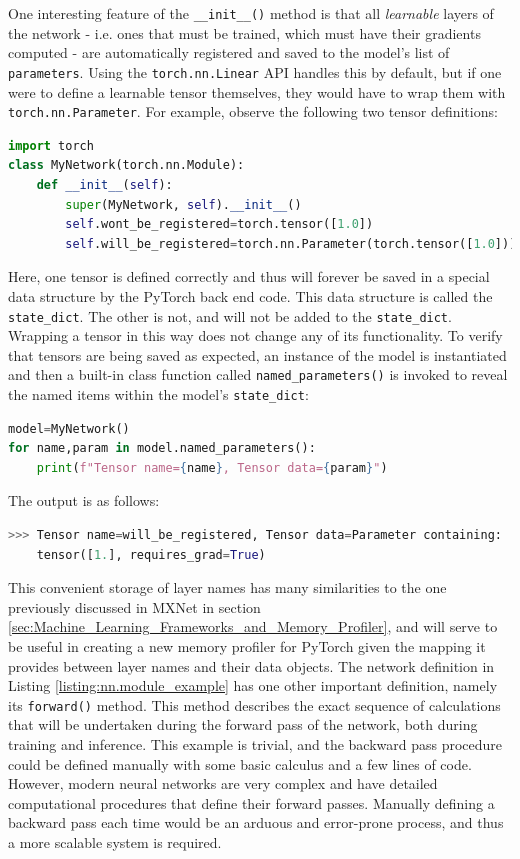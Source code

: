 \documentclass[12pt,letterpaper]{article}
\begin{document}
One interesting feature of the \texttt{\_\_init\_\_()} method is that all \textit{learnable} layers of the network - i.e. ones that must be trained, which must have their gradients computed - are automatically registered and saved to the model's list of \texttt{parameters}. Using the \texttt{torch.nn.Linear} API handles this by default, but if one were to define a learnable tensor themselves, they would have to wrap them with \texttt{torch.nn.Parameter}. For example, observe the following two tensor definitions: 

\begin{lstlisting}[language=Python]
import torch
class MyNetwork(torch.nn.Module):
    def __init__(self):
        super(MyNetwork, self).__init__()
        self.wont_be_registered=torch.tensor([1.0])
        self.will_be_registered=torch.nn.Parameter(torch.tensor([1.0]))
\end{lstlisting}
Here, one tensor is defined correctly and thus will forever be saved in a special data structure by the PyTorch back end code. This data structure is called the \texttt{state\_dict}. The other is not, and will not be added to the \texttt{state\_dict}. Wrapping a tensor in this way does not change any of its functionality. To verify that tensors are being saved as expected, an instance of the model is instantiated and then a built-in class function called \texttt{named\_parameters()} is invoked to reveal the named items within the model's \texttt{state\_dict}:
\begin{lstlisting}[language=Python]
model=MyNetwork()
for name,param in model.named_parameters():
    print(f"Tensor name={name}, Tensor data={param}")
\end{lstlisting}
The output is as follows:
\begin{lstlisting}[language=Python]
>>> Tensor name=will_be_registered, Tensor data=Parameter containing:
    tensor([1.], requires_grad=True)
\end{lstlisting}
\par
This convenient storage of layer names has many similarities to the one previously discussed in MXNet in section \ref{sec:Machine_Learning_Frameworks_and_Memory_Profiler}, and will serve to be useful in creating a new memory profiler for PyTorch given the mapping it provides between layer names and their data objects. 
The network definition in Listing \ref{listing:nn.module_example} has one other important definition, namely its \texttt{forward()} method. This method describes the exact sequence of calculations that will be undertaken during the forward pass of the network, both during training and inference. This example is trivial, and the backward pass procedure could be defined manually with some basic calculus and a few lines of code. However, modern neural networks are very complex and have detailed computational procedures that define their forward passes. Manually defining a backward pass each time would be an arduous and error-prone process, and thus a more scalable system is required.
\par
\end{document}
